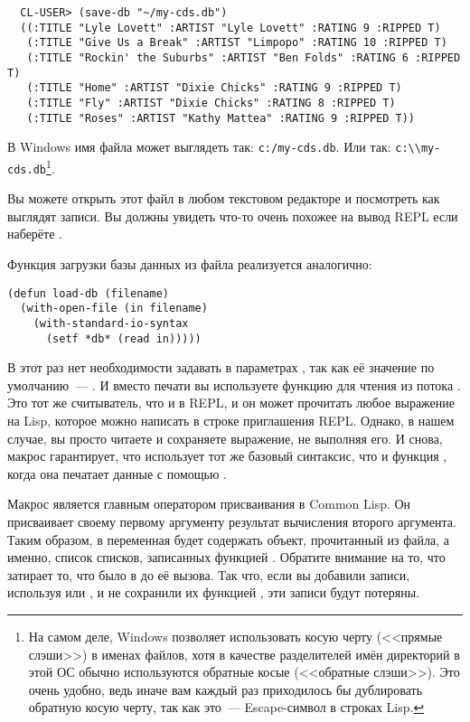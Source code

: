 \begin{verbatim}
  CL-USER> (save-db "~/my-cds.db")
  ((:TITLE "Lyle Lovett" :ARTIST "Lyle Lovett" :RATING 9 :RIPPED T)
   (:TITLE "Give Us a Break" :ARTIST "Limpopo" :RATING 10 :RIPPED T)
   (:TITLE "Rockin' the Suburbs" :ARTIST "Ben Folds" :RATING 6 :RIPPED T)
   (:TITLE "Home" :ARTIST "Dixie Chicks" :RATING 9 :RIPPED T)
   (:TITLE "Fly" :ARTIST "Dixie Chicks" :RATING 8 :RIPPED T)
   (:TITLE "Roses" :ARTIST "Kathy Mattea" :RATING 9 :RIPPED T))
\end{verbatim}

В Windows имя файла может выглядеть так: \lstinline!c:/my-cds.db!. Или так:
\lstinline!c:\\my-cds.db!\footnote{На самом деле, Windows позволяет использовать косую
  черту (<<прямые слэши>>) в именах файлов, хотя в качестве разделителей имён директорий в
  этой ОС обычно используются обратные косые (<<обратные слэши>>). Это очень удобно, ведь
  иначе вам каждый раз приходилось бы дублировать обратную косую черту, так как это~---
  Escape-символ в строках Lisp.}.

Вы можете открыть этот файл в любом текстовом редакторе и посмотреть как выглядят
записи. Вы должны увидеть что-то очень похожее на вывод REPL если наберёте .

Функция загрузки базы данных из файла реализуется аналогично:

\begin{lstlisting}
(defun load-db (filename)
  (with-open-file (in filename)
    (with-standard-io-syntax
      (setf *db* (read in)))))
\end{lstlisting}

В этот раз нет необходимости задавать  в параметрах
, так как её значение по умолчанию~--- . И вместо печати
вы используете функцию  для чтения из потока . Это тот же
считыватель, что и в REPL, и он может прочитать любое выражение на Lisp, которое можно
написать в строке приглашения REPL. Однако, в нашем случае, вы просто читаете и сохраняете
выражение, не выполняя его. И снова, макрос  гарантирует,
что  использует тот же базовый синтаксис, что и функция , когда
она печатает данные с помощью .

Макрос  является главным оператором присваивания в Common Lisp. Он
присваивает своему первому аргументу результат вычисления второго аргумента. Таким образом,
в  переменная  будет содержать объект, прочитанный из файла, а
именно, список списков, записанных функцией . Обратите внимание на то, что
 затирает то, что было в  до её вызова. Так что, если вы добавили
записи, используя  или , и не сохранили их функцией
, эти записи будут потеряны.


